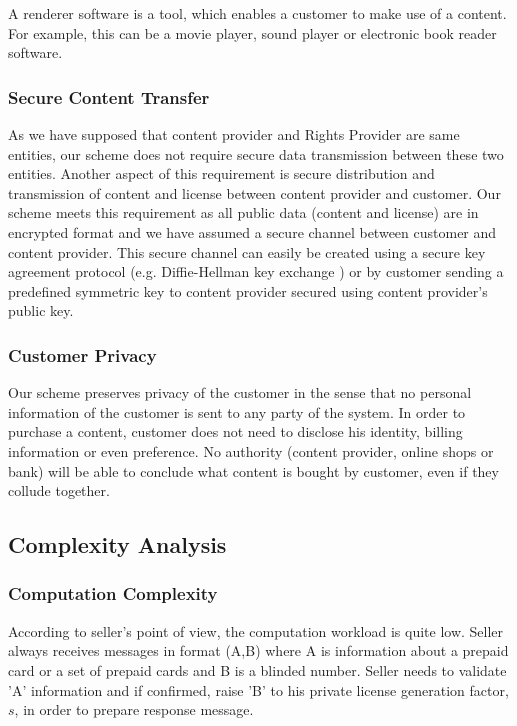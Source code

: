 \documentclass[times]{secauth}
\begin{document}
A renderer software is a tool, which enables a customer to make use of a content. For example, this can be a movie player, sound player or electronic book reader software.

\subsubsection{Secure Content Transfer}
As we have supposed that content provider and Rights Provider are same entities, our scheme does not require secure data transmission between these two entities.
Another aspect of this requirement is secure distribution and transmission of content and license between content provider and customer. Our scheme meets this requirement as all public data (content and license) are in encrypted format and we have assumed a secure channel between customer and content provider. This secure channel can easily be created using a secure key agreement protocol (e.g. Diffie-Hellman key exchange \cite{N40}) or by customer sending a predefined symmetric key to content provider secured using content provider's public key.


\subsubsection{Customer Privacy}
Our scheme preserves privacy of the customer in the sense that no personal information of the customer is sent to any party of the system. In order to purchase a content, customer does not need to disclose his identity, billing information or even preference. No authority (content provider, online shops or bank) will be able to conclude what content is bought by customer, even if they collude together.

\subsection{Complexity Analysis}
\label{sec:complexity}
\subsubsection{Computation Complexity}
According to seller's point of view, the computation workload is quite low. Seller always receives messages in format (A,B) where A is information about a prepaid card or a set of prepaid cards and B is a blinded number. Seller needs to validate 'A' information and if confirmed, raise 'B' to his private license generation factor, $s$, in order to prepare response message. 
\end{document}
